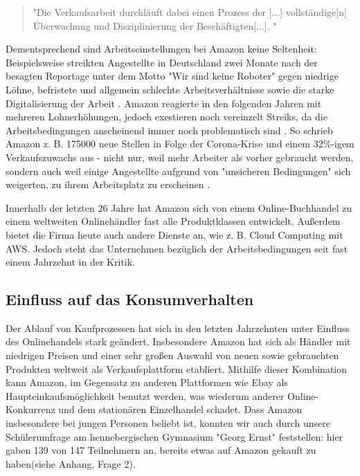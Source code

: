 \documentclass[a4paper, 12pt]{scrartcl}
\begin{document}
\begin{quote}
    "Die Verkaufsarbeit durchläuft dabei einen Prozess der [...] vollständige[n] Überwachung und Disziplinierung der Beschäftigten[...]. \cite[S. 29]{Apicella}"
\end{quote}
Dementsprechend sind Arbeitseinstellungen bei Amazon keine Seltenheit: Beispielsweise streikten Angestellte in Deutschland zwei Monate nach der besagten Reportage unter dem Motto "Wir sind keine Roboter" gegen niedrige Löhne, befristete und allgemein schlechte Arbeitsverhältnisse sowie die starke Digitalisierung der Arbeit \cite[S. 6]{Apicella}. Amazon reagierte in den folgenden Jahren mit mehreren Lohnerhöhungen, jedoch exestieren noch vereinzelt Streiks, da die Arbeitsbedingungen anscheinend immer noch problematisch sind \cite{JGraf}. So schrieb Amazon z. B. 175000 neue Stellen in Folge der Corona-Krise und einem 32\%-igem Verkaufszuwachs aus - nicht nur, weil mehr Arbeiter als vorher gebraucht werden, sondern auch weil einige Angestellte aufgrund von "unsicheren Bedingungen" sich weigerten, zu ihrem Arbeitsplatz zu erscheinen \cite{Theweek}.

Innerhalb der letzten 26 Jahre hat Amazon sich von einem Online-Buchhandel zu einem weltweiten Onlinehändler fast alle Produktklassen entwickelt. Außerdem bietet die Firma heute auch andere Dienste an, wie z. B. Cloud Computing mit \ac{AWS}. Jedoch steht das Unternehmen bezüglich der Arbeitsbedingungen seit fast einem Jahrzehnt in der Kritik.






            
        \subsection{Einfluss auf das Konsumverhalten }
        
        
        
        
        
        
        Der Ablauf von Kaufprozessen hat sich in den letzten Jahrzehnten unter Einfluss des Onlinehandels stark geändert. Insbesondere Amazon hat sich als Händler mit niedrigen Preisen und einer sehr großen Auswahl von neuen sowie gebrauchten Produkten weltweit als Verkaufsplattform etabliert. Mithilfe dieser Kombination kann Amazon, im Gegensatz zu anderen Plattformen wie Ebay als Haupteinkaufsmöglichkeit benutzt werden, was wiederum anderer Online-Konkurrenz und dem stationären Einzelhandel schadet. Dass Amazon insbesondere bei jungen Personen beliebt ist, konnten wir auch durch unsere Schülerumfrage am hennebergischen Gymnasium "Georg Ernst" feststellen: hier gaben 139 von 147 Teilnehmern an, bereits etwas auf Amazon gekauft zu haben(siehe Anhang, Frage 2).
\end{document}
